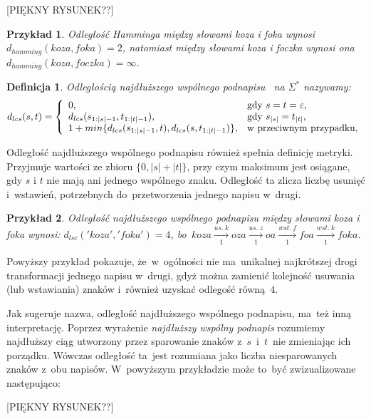 \documentclass[12pt, twoside, openany]{report}
\theoremstyle{plain}
\newtheorem{defi}{Definicja}[section]
\newtheorem{prz}{Przykład}[section]
\begin{document}
[PIĘKNY RYSUNEK??]

\begin{prz}
Odległość Hamminga między słowami \emph{koza} i \emph{foka} wynosi $d_{hamming}(koza, foka) = 2$, natomiast między słowami \emph{koza} i \emph{foczka} wynosi ona $d_{hamming}(koza, foczka) = \infty$.
\end{prz}

\begin{defi}
\emph{Odległością najdłuższego wspólnego podnapisu}~\cite{Needleman2008:generalmethod} na $\Sigma^*$ nazywamy:
$$
d_{lcs}(s, t) = \left\{
\begin{array}{l l}     
    0, & \text{gdy } s = t = \varepsilon,\\
    d_{lcs}(s_{1:|s|-1}, t_{1:|t|-1}), & \text{gdy } s_{|s|} = t_{|t|}, \\
    1+min\{d_{lcs}(s_{1:|s|-1}, t), d_{lcs}(s, t_{1:|t|-1})\}, & \text{w przeciwnym przypadku},
\end{array}\right.
$$
\end{defi}

Odległość najdłuższego wspólnego podnapisu również spełnia definicję metryki. Przyjmuje wartości ze zbioru $\{0, |s|+|t|\}$, przy czym maksimum jest osiągane, gdy $s$ i $t$ nie mają ani jednego wspólnego znaku.
Odległość ta zlicza liczbę usunięć i~wstawień, potrzebnych do~przetworzenia jednego napisu w~drugi. 

\begin{prz}
Odległość najdłuższego wspólnego podnapisu między słowami \emph{koza} i \emph{foka} wynosi: $d_{lsc}('koza', 'foka') = 4$, bo~$koza  \xrightarrow[1]{us.\ k} oza \xrightarrow[1]{us.\ z} oa  \xrightarrow[1]{wst.\ f} foa \xrightarrow[1]{wst.\ k} foka$.
\end{prz}

Powyższy przykład pokazuje, że~w~ogólności nie ma~unikalnej najkrótszej drogi transformacji jednego napisu w~drugi, gdyż można zamienić kolejność usuwania (lub wstawiania) znaków i~również uzyskać odlegość równą~$4$.

Jak sugeruje nazwa, odległość najdłuższego wspólnego podnapisu, ma~też inną interpretację. Poprzez wyrażenie \emph{najdłuższy wspólny podnapis} rozumiemy najdłuższy ciąg utworzony przez sparowanie znaków z~$s$~i~$t$~nie zmieniając ich porządku. Wówczas odległość ta~jest rozumiana jako liczba niesparowanych znaków z~obu napisów. W~powyższym przykładzie może to~być zwizualizowane następująco:
	
[PIĘKNY RYSUNEK??]
\end{document}
